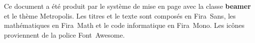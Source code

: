 
\begin{frame}[plain]
  \begin{adjustwidth}{20mm}{20mm}
    \scriptsize \raggedright %
    Ce document a été produit par le système de mise en page
    {\XeLaTeX} avec la classe \textbf{beamer} et le thème Metropolis.
    Les titres et le texte sont composés en Fira~Sans, les
    mathématiques en Fira~Math et le code informatique en Fira~Mono.
    Les icônes proviennent de la police Font~Awesome.
  \end{adjustwidth}
\end{frame}

